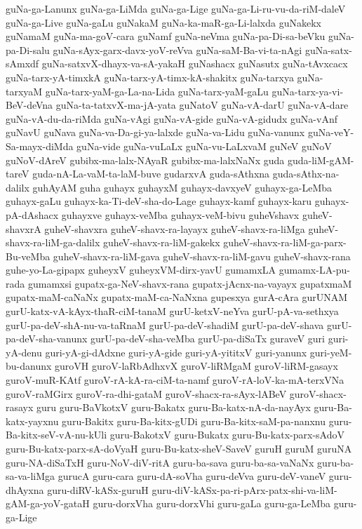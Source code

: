 {guNa-ga-Lanunx
guNa-ga-LiMda
guNa-ga-Lige
guNa-ga-Li-ru-vu-da-riM-daleV
guNa-ga-Live
guNa-gaLu
guNakaM
guNa-ka-maR-ga-Li-lalxda
guNakekx
guNamaM
guNa-ma-goV-cara
guNamf
guNa-neVma
guNa-pa-Di-sa-beVku
guNa-pa-Di-salu
guNa-sAyx-garx-davx-yoV-reVva
guNa-saM-Ba-vi-ta-nAgi
guNa-satx-sAmxdf
guNa-satxvX-dhayx-va-sA-yakaH
guNashacx
guNasutx
guNa-tAvxcacx
guNa-tarx-yA-timxkA
guNa-tarx-yA-timx-kA-shakitx
guNa-tarxya
guNa-tarxyaM
guNa-tarx-yaM-ga-La-na-Lida
guNa-tarx-yaM-gaLu
guNa-tarx-ya-vi-BeV-deVna
guNa-ta-tatxvX-ma-jA-yata
guNatoV
guNa-vA-darU
guNa-vA-dare
guNa-vA-du-da-riMda
guNa-vAgi
guNa-vA-gide
guNa-vA-gidudx
guNa-vAnf
guNavU
guNava
guNa-va-Da-gi-ya-lalxde
guNa-va-Lidu
guNa-vanunx
guNa-veY-Sa-mayx-diMda
guNa-vide
guNa-vuLaLx
guNa-vu-LaLxvaM
guNeV
guNoV
guNoV-dAreV
gubibx-ma-lalx-NAyaR
gubibx-ma-lalxNaNx
guda
guda-liM-gAM-tareV
guda-nA-La-vaM-ta-laM-buve
gudarxvA
guda-sAthxna
guda-sAthx-na-dalilx
guhAyAM
guha
guhayx
guhayxM
guhayx-davxyeV
guhayx-ga-LeMba
guhayx-gaLu
guhayx-ka-Ti-deV-sha-do-Lage
guhayx-kamf
guhayx-karu
guhayx-pA-dAshacx
guhayxve
guhayx-veMba
guhayx-veM-bivu
guheVshavx
guheV-shavxrA
guheV-shavxra
guheV-shavx-ra-layayx
guheV-shavx-ra-liMga
guheV-shavx-ra-liM-ga-dalilx
guheV-shavx-ra-liM-gakekx
guheV-shavx-ra-liM-ga-parx-Bu-veMba
guheV-shavx-ra-liM-gava
guheV-shavx-ra-liM-gavu
guheV-shavx-rana
guhe-yo-La-gipapx
guheyxV
guheyxVM-dirx-yavU
gumamxLA
gumamx-LA-pu-rada
gumamxsi
gupatx-ga-NeV-shavx-rana
gupatx-jAcnx-na-vayayx
gupatxmaM
gupatx-maM-caNaNx
gupatx-maM-ca-NaNxna
gupesxya
gurA-cAra
gurUNAM
gurU-katx-vA-kAyx-thaR-ciM-tanaM
gurU-ketxV-neYva
gurU-pA-va-sethxya
gurU-pa-deV-shA-nu-va-taRnaM
gurU-pa-deV-shadiM
gurU-pa-deV-shava
gurU-pa-deV-sha-vanunx
gurU-pa-deV-sha-veMba
gurU-pa-diSaTx
guraveV
guri
guri-yA-denu
guri-yA-gi-dAdxne
guri-yA-gide
guri-yA-yititxV
guri-yanunx
guri-yeM-bu-danunx
guroVH
guroV-laRbAdhxvX
guroV-liRMgaM
guroV-liRM-gasayx
guroV-muR-KAtf
guroV-rA-kA-ra-ciM-ta-namf
guroV-rA-loV-ka-mA-terxVNa
guroV-raMGirx
guroV-ra-dhi-gataM
guroV-shacx-ra-sAyx-lABeV
guroV-shacx-rasayx
guru
guru-BaVkotxV
guru-Bakatx
guru-Ba-katx-nA-da-nayAyx
guru-Ba-katx-yayxnu
guru-Bakitx
guru-Ba-kitx-gUDi
guru-Ba-kitx-saM-pa-nanxnu
guru-Ba-kitx-seV-vA-nu-kUli
guru-BakotxV
guru-Bukatx
guru-Bu-katx-parx-sAdoV
guru-Bu-katx-parx-sA-doVyaH
guru-Bu-katx-sheV-SaveV
guruH
guruM
guruNA
guru-NA-diSaTxH
guru-NoV-diV-ritA
guru-ba-sava
guru-ba-sa-vaNaNx
guru-ba-sa-va-liMga
gurucA
guru-cara
guru-dA-soVha
guru-deVva
guru-deV-vaneV
guru-dhAyxna
guru-diRV-kASx-guruH
guru-diV-kASx-pa-ri-pArx-patx-shi-va-liM-gAM-ga-yoV-gataH
guru-dorxVha
guru-dorxVhi
guru-gaLa
guru-ga-LeMba
guru-ga-Lige
}
